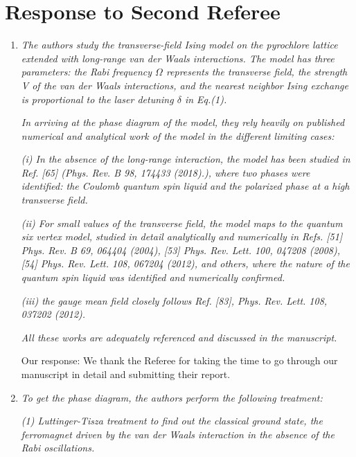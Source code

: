 \documentclass[
onecolumn,
superscriptaddress,
longbibliography,
nofootinbib,
 amsmath,amssymb,
 aps,
prb
]{revtex4-2}
\newcommand{\response}[1]{\textcolor{Mulberry}{#1}}
\begin{document}
\section{Response to Second Referee}
\begin{enumerate}

\item \textit{The authors study the transverse-field Ising model on the pyrochlore
lattice extended with long-range van der Waals interactions. The model
has three parameters: the Rabi frequency $\Omega$ represents the
transverse field, the strength V of the van der Waals interactions,
and the nearest neighbor Ising exchange is proportional to the laser
detuning $\delta$ in Eq.(1).}

\textit{In arriving at the phase diagram of the model, they rely heavily on
published numerical and analytical work of the model in the different
limiting cases:}

\textit{(i) In the absence of the long-range interaction, the model has been
studied in Ref. [65] (Phys. Rev. B 98, 174433 (2018).), where two
phases were identified: the Coulomb quantum spin liquid and the
polarized phase at a high transverse field.}

\textit{(ii) For small values of the transverse field, the model maps to the
quantum six vertex model, studied in detail analytically and
numerically in Refs. [51] Phys. Rev. B 69, 064404 (2004), [53] Phys.
Rev. Lett. 100, 047208 (2008), [54] Phys. Rev. Lett. 108, 067204
(2012), and others, where the nature of the quantum spin liquid was
identified and numerically confirmed.}

\textit{(iii) the gauge mean field closely follows Ref. [83], Phys. Rev. Lett.
108, 037202 (2012).}

\textit{All these works are adequately referenced and discussed in the
manuscript.}

\response{Our response: We thank the Referee for taking the time to go through our manuscript in detail and  submitting their report.}

\item \textit{To get the phase diagram, the authors perform the following treatment:}
    
\textit{(1) Luttinger-Tisza treatment to find out the classical ground state, the ferromagnet driven by the van der Waals interaction in the absence of the Rabi oscillations.}


\end{enumerate}
\end{document}
